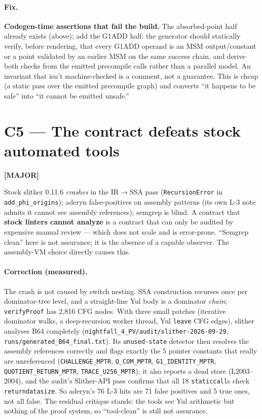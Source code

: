\paragraph{Fix.}
\textbf{Codegen-time assertions that fail the build.} The absorbed-point
half already exists (above); add the G1ADD half: the
generator should statically verify, before rendering, that every
G1ADD operand is an MSM output/constant or a point validated by an
earlier MSM on the same success chain, and derive both checks from
the emitted precompile calls rather than a parallel model. An invariant that
isn't machine-checked is a comment, not a guarantee. This is
cheap (a static pass over the emitted precompile graph) and converts
``it happens to be safe'' into ``it cannot be emitted unsafe.''

\section{C5 --- The contract defeats stock automated tools}
\label{sec:c5-tools}
\textcolor{mathpurple}{\textbf{[MAJOR]}} 

Stock slither 0.11.6 \emph{crashes} in the IR$\to$SSA pass
(\texttt{RecursionError} in \texttt{add\_phi\_origins}); aderyn
false-positives on assembly patterns (its own L-3 note admits it
cannot see assembly references); semgrep is blind. A contract
that \textbf{stock linters cannot analyze} is a contract that can only
be audited by expensive manual review --- which does not scale
and is error-prone. ``Semgrep clean'' here is not assurance; it
is the absence of a capable observer. The assembly-VM choice
directly causes this.

\paragraph{Correction (measured).} The crash is not caused by
switch nesting. SSA construction recurses once per
dominator-tree level, and a straight-line Yul body is a dominator
\emph{chain}; \texttt{verifyProof} has 2{,}816 CFG nodes. With
three small patches (iterative dominator walks, a deep-recursion
worker thread, Yul \texttt{leave} CFG edges), slither analyses B64
completely (\texttt{nightfall\_\allowbreak{}4\_\allowbreak{}PV/\allowbreak{}audit/\allowbreak{}slither-2026-09-29},
\texttt{runs/\allowbreak{}generated\_\allowbreak{}B64\_\allowbreak{}final.txt}). Its
\texttt{unused-state} detector then resolves the assembly
references correctly and flags exactly the 5 pointer constants
that really are unreferenced (\texttt{CHALLENGE\_MPTR},
\texttt{Q\_COM\_MPTR}, \texttt{G1\_\allowbreak{}IDENTITY\_\allowbreak{}MPTR},
\texttt{QUOTIENT\_\allowbreak{}RETURN\_\allowbreak{}MPTR}, \texttt{TRACE\_U256\_MPTR}); it
also reports a dead store (L2003--2004), and the audit's
Slither-API pass confirms that all 18 \texttt{staticcall}s check
\texttt{returndatasize}. So aderyn's 76 L-3 hits are 71 false
positives and 5 true ones, not all false. The residual critique
stands: the tools see Yul arithmetic but nothing of the proof
system, so ``tool-clean'' is still not assurance.

